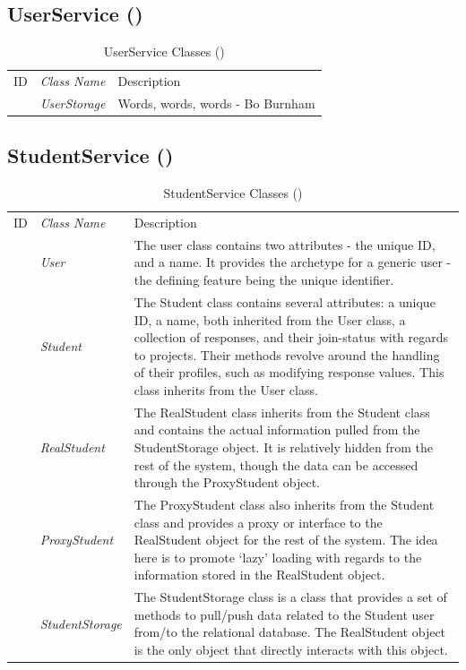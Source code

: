 \documentclass[12pt,letterpaper]{article}
\begin{document}
\subsection{UserService ()}
\begin{table}[H]
	\caption{UserService Classes ()} 
	\begin{tabu} to 
	    \tableheader{}ID & Class Name & Description \\
         & UserStorage & Words, words, words - Bo Burnham\\
	\end{tabu}
\end{table}

\subsection{StudentService ()}
\begin{table}[H]
	\caption{StudentService Classes ()} 
	\begin{tabu} to 
	    \tableheader{}ID & Class Name & Description \\
		 & User & The user class contains two attributes - the unique ID, and a name. It provides the archetype for a generic user - the defining feature being the unique identifier.\\
		 & Student & The Student class contains several attributes: a unique ID, a name, both inherited from the User class, a collection of responses, and their join-status with regards to projects. Their methods revolve around the handling of their profiles, such as modifying response values. This class inherits from the User class. \\
		 & RealStudent & The RealStudent class inherits from the Student class and contains the actual information pulled from the StudentStorage object. It is relatively hidden from the rest of the system, though the data can be accessed through the ProxyStudent object.\\
		 & ProxyStudent & The ProxyStudent class also inherits from the Student class and provides a proxy or interface to the RealStudent object for the rest of the system. The idea here is to promote `lazy' loading with regards to the information stored in the RealStudent object.\\
		 & StudentStorage & The StudentStorage class is a class that provides a set of methods to pull/push data related to the Student user from/to the relational database. The RealStudent object is the only object that directly interacts with this object.\\
	\end{tabu}
\end{table}
\end{document}
